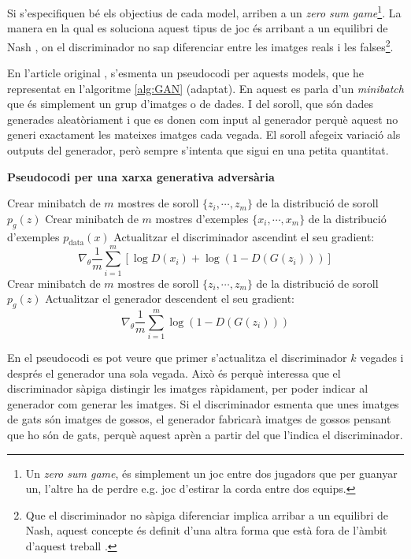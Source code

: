 Si s'especifiquen bé els objectius de cada model, arriben a un \textit{zero sum game}\footnote{Un \textit{zero sum game}, és simplement un joc entre dos jugadors que per guanyar un, l'altre ha de perdre e.g. joc d'estirar la corda entre dos equips.}. La manera en la qual es soluciona aquest tipus de joc és arribant a un equilibri de Nash \cite{QGAN_exp, GAN2014}, on el discriminador no sap diferenciar entre les imatges reals i les falses\footnote{Que el discriminador no sàpiga diferenciar implica arribar a un equilibri de Nash, aquest concepte és definit d'una altra forma que està fora de l'àmbit d'aquest treball \cite{GAN2014}.}.

En l'article original \cite{GAN2014}, s'esmenta un pseudocodi per aquests models, que he representat en l'algoritme \ref{alg:GAN} (adaptat). En aquest es parla d'un \textit{minibatch} que és simplement un grup d'imatges o de dades. I del soroll, que són dades generades aleatòriament i que es donen com input al generador perquè aquest no generi exactament les mateixes imatges cada vegada. El soroll afegeix variació als outputs del generador, però sempre s'intenta que sigui en una petita quantitat.

\begin{algorithm}[H]
	\caption{\textbf{Pseudocodi per una xarxa generativa adversària}}\label{alg:GAN}
	\begin{algorithmic}
		\State Crear minibatch de $m$ mostres de soroll $\{z_i, \cdots, z_m\}$ de la distribució de soroll $p_g(z)$
		\State Crear minibatch de $m$ mostres d'exemples $\{x_i, \cdots, x_m\}$ de la distribució d'exemples $p_{\mathrm{data}}(x)$
		\State Actualitzar el discriminador ascendint el seu gradient: 
		$$
		\nabla_\theta \frac{1}{m}\sum_{i=1}^{m}\left[\log D(x_i) + \log(1- D(G(z_i)))\right]
		$$
		\EndFor
		\State Crear minibatch de $m$ mostres de soroll $\{z_i, \cdots, z_m\}$ de la distribució de soroll $p_g(z)$
		\State Actualitzar el generador descendent el seu gradient:
		$$
		\nabla_\theta \frac{1}{m} \sum_{i=1}^{m} \log(1-D(G(z_i)))
		$$
		\EndFor
	\end{algorithmic}

\end{algorithm}

En el pseudocodi es pot veure que primer s'actualitza el discriminador $k$ vegades i després  el generador una sola vegada. Això és perquè interessa que el discriminador sàpiga distingir les imatges ràpidament, per poder indicar al generador com generar les imatges. Si el discriminador esmenta que unes imatges de gats són imatges de gossos, el generador fabricarà imatges de gossos pensant que ho són de gats, perquè aquest aprèn a partir del que l'indica el discriminador.

